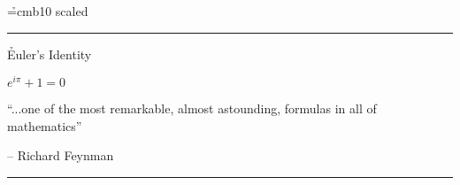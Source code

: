 \font\h=cmb10 scaled
\hrule\vskip 1in

{\h Euler's Identity}

\vskip 0.5in
\centerline{$e^{i\pi} + 1 = 0$}
\vskip 0.5in

``...one of the most remarkable, almost astounding, formulas in all of mathematics''

-- Richard Feynman

\vskip 1in
\hrule
\bye
